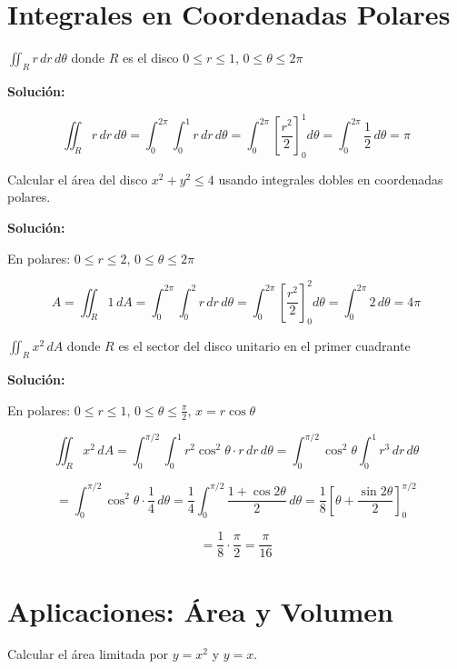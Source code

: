 \documentclass[12pt, a4paper]{book}
\begin{document}
\section{Integrales en Coordenadas Polares}

\begin{ejercicio}
$\iint_R r \, dr \, d\theta$ donde $R$ es el disco $0 \leq r \leq 1$, $0 \leq \theta \leq 2\pi$
\end{ejercicio}

\textbf{Solución:}

\[
\iint_R r \, dr \, d\theta = \int_0^{2\pi} \int_0^1 r \, dr \, d\theta = \int_0^{2\pi} [\frac{r^2}{2}]_0^1 d\theta = \int_0^{2\pi} \frac{1}{2} \, d\theta = \pi
\]

\begin{ejercicio}
Calcular el área del disco $x^2 + y^2 \leq 4$ usando integrales dobles en coordenadas polares.
\end{ejercicio}

\textbf{Solución:}

En polares: $0 \leq r \leq 2$, $0 \leq \theta \leq 2\pi$

\[
A = \iint_R 1 \, dA = \int_0^{2\pi} \int_0^2 r \, dr \, d\theta = \int_0^{2\pi} [\frac{r^2}{2}]_0^2 d\theta = \int_0^{2\pi} 2 \, d\theta = 4\pi
\]

\begin{ejercicio}
$\iint_R x^2 \, dA$ donde $R$ es el sector del disco unitario en el primer cuadrante
\end{ejercicio}

\textbf{Solución:}

En polares: $0 \leq r \leq 1$, $0 \leq \theta \leq \frac{\pi}{2}$, $x = r\cos\theta$

\[
\iint_R x^2 \, dA = \int_0^{\pi/2} \int_0^1 r^2\cos^2\theta \cdot r \, dr \, d\theta = \int_0^{\pi/2} \cos^2\theta \int_0^1 r^3 \, dr \, d\theta
\]

\[
= \int_0^{\pi/2} \cos^2\theta \cdot \frac{1}{4} \, d\theta = \frac{1}{4}\int_0^{\pi/2} \frac{1+\cos 2\theta}{2} \, d\theta = \frac{1}{8}[\theta + \frac{\sin 2\theta}{2}]_0^{\pi/2}
\]

\[
= \frac{1}{8} \cdot \frac{\pi}{2} = \frac{\pi}{16}
\]

\section{Aplicaciones: Área y Volumen}

\begin{ejercicio}
Calcular el área limitada por $y = x^2$ y $y = x$.
\end{ejercicio}
\end{document}
